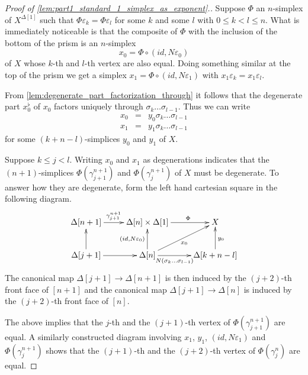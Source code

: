 \begin{proof}[Proof of \cref{lem:part1_standard_1_simplex_as_exponent}.]
Suppose $\Phi$ an $n$-simplex of $X^{\Delta [1]}$ such that $\Phi\varepsilon _k=\Phi \varepsilon _l$ for some $k$ and some $l$ with $0\leq k<l\leq n$. What is immediately noticeable is that the composite of $\Phi$ with the inclusion of the bottom of the prism is an $n$-simplex
\[x_0=\Phi \circ (id,N\varepsilon _0)\]
of $X$ whose $k$-th and $l$-th vertex are also equal. Doing something similar at the top of the prism we get a simplex
$x_1=\Phi \circ (id,N\varepsilon _1)$ with $x_1\varepsilon _k=x_1\varepsilon _l$.

From \cref{lem:degenerate_part_factorization_through} it follows that the degenerate part $x_0^\flat$ of $x_0$ factors uniquely through $\sigma _k\dots \sigma _{l-1}$. Thus we can write
\begin{displaymath}
\begin{array}{rcl}
x_0 & = & y_0\sigma _k\dots \sigma _{l-1} \\
x_1 & = & y_1\sigma _k\dots \sigma _{l-1}
\end{array}
\end{displaymath}
for some $(k+n-l)$-simplices $y_0$ and $y_1$ of $X$.

Suppose $k\leq j<l$. Writing $x_0$ and $x_1$ as degenerations indicates that the $(n+1)$-simplices $\Phi (\gamma ^{n+1}_{j+1})$ and $\Phi (\gamma ^{n+1}_j)$ of $X$ must be degenerate. To answer how they are degenerate, form the left hand cartesian square in the following diagram.
\begin{displaymath}
\xymatrix{
\Delta [n+1] \ar[r]^(.45){\gamma ^{n+1}_{j+1}} & \Delta [n]\times \Delta [1] \ar[r]^(.6)\Phi & X \\
\Delta [j+1] \ar[u] \ar[r] & \Delta [n] \ar[u]^{(id,N\varepsilon _0)} \ar[ur]_{x_0} \ar[r]_(.4){N(\sigma _k\dots \sigma _{l-1})} & \Delta [k+n-l] \ar[u]_{y_0}
}
\end{displaymath}
The canonical map $\Delta [j+1]\to \Delta [n+1]$ is then induced by the $(j+2)$-th front face of $[n+1]$ and the canonical map $\Delta [j+1]\to \Delta [n]$ is induced by the $(j+2)$-th front face of $[n]$.

The above implies that the $j$-th and the $(j+1)$-th vertex of $\Phi (\gamma ^{n+1}_{j+1})$ are equal. A similarly constructed diagram involving $x_1$, $y_1$, $(id,N\varepsilon _1)$ and $\Phi (\gamma ^{n+1}_j)$ shows that the $(j+1)$-th and the $(j+2)$-th vertex of $\Phi (\gamma ^n_j)$ are equal.


\end{proof}
